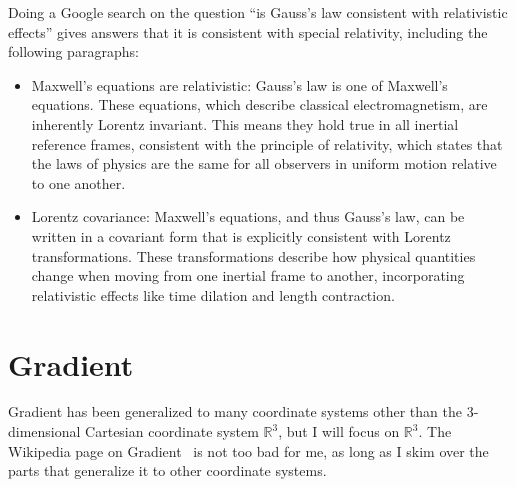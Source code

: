 \documentclass[a4paper]{article}
\theoremstyle{plain}
\theoremstyle{definition}
\begin{document}
Doing a Google search on the question ``is Gauss's law consistent with
relativistic effects'' gives answers that it {\emi is} consistent with
special relativity, including the following paragraphs:

\begin{itemize}
\item
Maxwell's equations are relativistic: Gauss's law is one of Maxwell's
equations.  These equations, which describe classical
electromagnetism, are inherently Lorentz invariant.  This means they
hold true in all inertial reference frames, consistent with the
principle of relativity, which states that the laws of physics are the
same for all observers in uniform motion relative to one another.
\item
Lorentz covariance: Maxwell's equations, and thus Gauss's law, can be
written in a covariant form that is explicitly consistent with Lorentz
transformations.  These transformations describe how physical
quantities change when moving from one inertial frame to another,
incorporating relativistic effects like time dilation and length
contraction.
\end{itemize}


\section{Gradient}
\label{sec:gradient}

Gradient has been generalized to many coordinate systems other than
the 3-dimensional Cartesian coordinate system $\mathbb{R}^3$, but I
will focus on $\mathbb{R}^3$.  The Wikipedia page on
Gradient~\cite{Gradient} is not too bad for me, as long as I skim over
the parts that generalize it to other coordinate systems.
\end{document}
